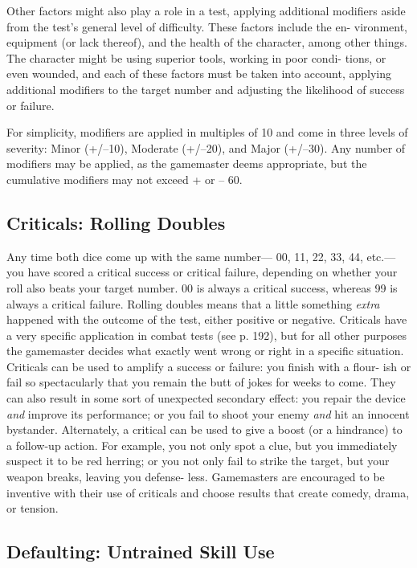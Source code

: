 Other factors might also play a 
role in a test, applying additional 
modifiers aside from the test's 
general level of difficulty. These factors include the en-
vironment, equipment (or lack thereof), and the health 
of the character, among other things. The character 
might be using superior tools, working in poor condi-
tions, or even wounded, and each of these factors must 
be taken into account, applying additional modifiers 
to the target number and adjusting the likelihood of 
success or failure.

For simplicity, modifiers are applied in multiples of 
10 and come in three levels of severity: Minor (+/–10), 
Moderate (+/–20), and Major (+/–30). Any number of 
modifiers may be applied, as the gamemaster deems 
appropriate, but the cumulative modifiers may not 
exceed + or – 60.

\subsection{Criticals: Rolling Doubles}

Any time both dice come up with the same number—
00, 11, 22, 33, 44, etc.—you have scored a critical 
success or critical failure, depending on whether your 
roll also beats your target number. 00 is always a 
critical success, whereas 99 is always a critical failure. 
Rolling doubles means that a little something \textit{extra }
happened with the outcome of the test, either positive 
or negative. Criticals have a very specific application 
in combat tests (see p. 192), but for all other purposes 
the gamemaster decides what exactly went wrong or 
right in a specific situation. Criticals can be used to 
amplify a success or failure: you finish with a flour-
ish or fail so spectacularly that you remain the butt 
of jokes for weeks to come. They can also result in 
some sort of unexpected secondary effect: you repair 
the device \textit{and} improve its performance; or you fail 
to shoot your enemy \textit{and} hit an innocent bystander. 
Alternately, a critical can be used to give a boost (or 
a hindrance) to a follow-up action. For example, you 
not only spot a clue, but you immediately suspect it 
to be red herring; or you not only fail to strike the 
target, but your weapon breaks, leaving you defense-
less. Gamemasters are encouraged to be inventive with 
their use of criticals and choose results that create 
comedy, drama, or tension.

\subsection{Defaulting: Untrained Skill Use}

